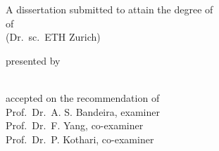 \begin{titlepage}
    \begin{center}
        \large
        \begingroup
        \endgroup

        \hfill

        \vfill

        \begingroup
            \spacedallcaps{\myTitle}
        \endgroup

        \vfill

        \begingroup
            A dissertation submitted to attain the degree of\\
            \vspace{0.5em}
            of
             \\
            (Dr.\ sc.\ ETH Zurich)
        \endgroup

        \vfill

        \begingroup
            presented by\\
            \vspace{0.5em}
            \spacedlowsmallcaps{\myName}\\
        \endgroup

        \vfill

        \begingroup
            accepted on the recommendation of\\
            \vspace{0.5em}
            Prof.\ Dr.\ A. S. Bandeira, examiner\\
            Prof.\ Dr.\ F. Yang, co-examiner\\
            Prof.\ Dr.\ P. Kothari, co-examiner
        \endgroup

        \vfill

        \myTime%

        \vfill
    \end{center}
\end{titlepage}
